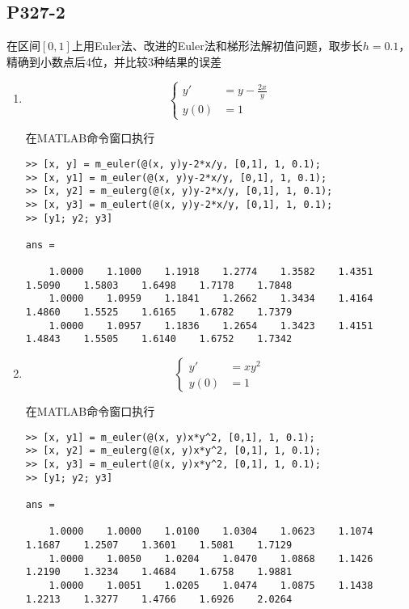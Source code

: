\subsection{P327-2}
在区间$[0, 1]$上用Euler法、改进的Euler法和梯形法解初值问题，取步长$h=0.1$，精确到小数点后4位，并比较3种结果的误差

\begin{enumerate}
\item
\begin{equation*}
\begin{cases}
y' & = y - \frac{2x}{y} \\
y(0) & = 1
\end{cases}
\end{equation*}

\begin{SOLVE}
在MATLAB命令窗口执行
\begin{lstlisting}
>> [x, y] = m_euler(@(x, y)y-2*x/y, [0,1], 1, 0.1);
>> [x, y1] = m_euler(@(x, y)y-2*x/y, [0,1], 1, 0.1);
>> [x, y2] = m_eulerg(@(x, y)y-2*x/y, [0,1], 1, 0.1);
>> [x, y3] = m_eulert(@(x, y)y-2*x/y, [0,1], 1, 0.1);
>> [y1; y2; y3]

ans =

    1.0000    1.1000    1.1918    1.2774    1.3582    1.4351    1.5090    1.5803    1.6498    1.7178    1.7848
    1.0000    1.0959    1.1841    1.2662    1.3434    1.4164    1.4860    1.5525    1.6165    1.6782    1.7379
    1.0000    1.0957    1.1836    1.2654    1.3423    1.4151    1.4843    1.5505    1.6140    1.6752    1.7342

\end{lstlisting}
\end{SOLVE}
\item
\begin{equation*}
\begin{cases}
y' & = x y^2 \\
y(0) & = 1
\end{cases}
\end{equation*}

\begin{SOLVE}
在MATLAB命令窗口执行
\begin{lstlisting}
>> [x, y1] = m_euler(@(x, y)x*y^2, [0,1], 1, 0.1);
>> [x, y2] = m_eulerg(@(x, y)x*y^2, [0,1], 1, 0.1);
>> [x, y3] = m_eulert(@(x, y)x*y^2, [0,1], 1, 0.1);
>> [y1; y2; y3]

ans =

    1.0000    1.0000    1.0100    1.0304    1.0623    1.1074    1.1687    1.2507    1.3601    1.5081    1.7129
    1.0000    1.0050    1.0204    1.0470    1.0868    1.1426    1.2190    1.3234    1.4684    1.6758    1.9881
    1.0000    1.0051    1.0205    1.0474    1.0875    1.1438    1.2213    1.3277    1.4766    1.6926    2.0264

\end{lstlisting}
\end{SOLVE}
\end{enumerate}